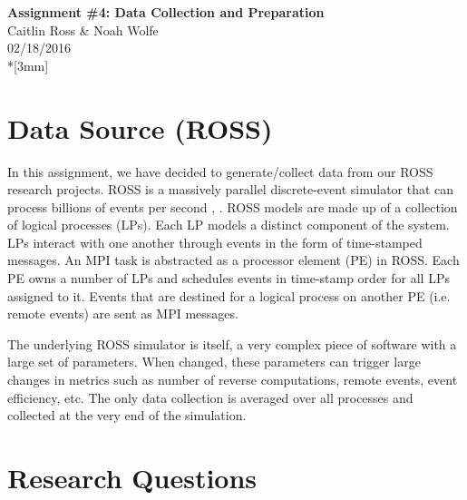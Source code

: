 \documentclass[12pt]{article}
\begin{document}
\thispagestyle{empty}
\begin{center}
{\Large\bf Assignment \#4: Data Collection and Preparation}
\vspace{3mm}
\\Caitlin Ross \& Noah Wolfe
\\02/18/2016
\\*[3mm]
\end{center}
\section{Data Source (ROSS)}
In this assignment, we have decided to generate/collect data from our ROSS research projects. 
ROSS is a massively parallel discrete-event simulator that
can process billions of events per second \cite{Holder}, \cite{Bauer}. ROSS
models are made up of a collection of logical processes (LPs).
Each LP models a distinct component of the system. LPs
interact with one another through events in the form of time-stamped messages. An MPI task is abstracted as a processor
element (PE) in ROSS. Each PE owns a number of LPs and
schedules events in time-stamp order for all LPs assigned to
it. Events that are destined for a logical process on another
PE (i.e. remote events) are sent as MPI messages. 

The underlying ROSS simulator is itself, a very complex piece of software with a large set of parameters. When changed, these parameters can trigger large changes in metrics such as number of reverse computations, remote events, event efficiency, etc. The only data collection is averaged over all processes and collected at the very end of the simulation. 

\section{Research Questions}
\end{document}
